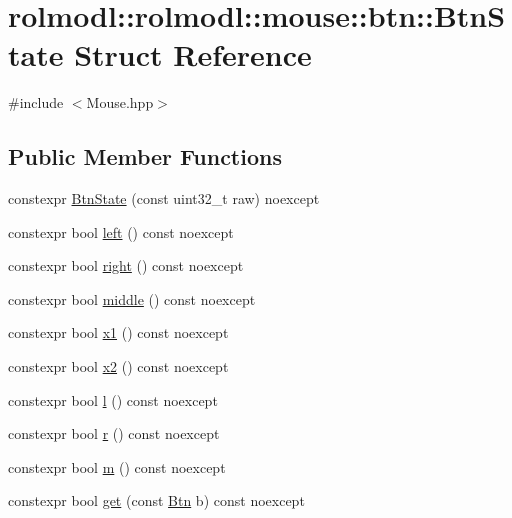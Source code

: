 \hypertarget{structrolmodl_1_1rolmodl_1_1mouse_1_1btn_1_1_btn_state}{}\section{rolmodl\+::rolmodl\+::mouse\+::btn\+::Btn\+State Struct Reference}
\label{structrolmodl_1_1rolmodl_1_1mouse_1_1btn_1_1_btn_state}


{\ttfamily \#include $<$Mouse.\+hpp$>$}

\subsection*{Public Member Functions}
\begin{DoxyCompactItemize}
\item 
constexpr \mbox{\hyperlink{structrolmodl_1_1rolmodl_1_1mouse_1_1btn_1_1_btn_state_a4d3185f0d2e974cb44051067c995b3b2}{Btn\+State}} (const uint32\+\_\+t raw) noexcept
\item 
constexpr bool \mbox{\hyperlink{structrolmodl_1_1rolmodl_1_1mouse_1_1btn_1_1_btn_state_a2b50d4b38757939b2fbd71ba99dbcecd}{left}} () const noexcept
\item 
constexpr bool \mbox{\hyperlink{structrolmodl_1_1rolmodl_1_1mouse_1_1btn_1_1_btn_state_a1d7ded964d561d1560a88d66f44c83a8}{right}} () const noexcept
\item 
constexpr bool \mbox{\hyperlink{structrolmodl_1_1rolmodl_1_1mouse_1_1btn_1_1_btn_state_a408eb39455a05ee298ad026e617c25ed}{middle}} () const noexcept
\item 
constexpr bool \mbox{\hyperlink{structrolmodl_1_1rolmodl_1_1mouse_1_1btn_1_1_btn_state_a9db57d030d7ec6864e689d58c0e63461}{x1}} () const noexcept
\item 
constexpr bool \mbox{\hyperlink{structrolmodl_1_1rolmodl_1_1mouse_1_1btn_1_1_btn_state_aaa1e0ee5f1da49d2f6d83f983e43e832}{x2}} () const noexcept
\item 
constexpr bool \mbox{\hyperlink{structrolmodl_1_1rolmodl_1_1mouse_1_1btn_1_1_btn_state_ae51d08a933a24f90a6f8487b49ecc9eb}{l}} () const noexcept
\item 
constexpr bool \mbox{\hyperlink{structrolmodl_1_1rolmodl_1_1mouse_1_1btn_1_1_btn_state_a54b06f68dfa6b7a7302f439bc3da97a8}{r}} () const noexcept
\item 
constexpr bool \mbox{\hyperlink{structrolmodl_1_1rolmodl_1_1mouse_1_1btn_1_1_btn_state_a14510ff05e68099d3f8f7742da7d682f}{m}} () const noexcept
\item 
constexpr bool \mbox{\hyperlink{structrolmodl_1_1rolmodl_1_1mouse_1_1btn_1_1_btn_state_a5beec883e4525ad7154274d175241571}{get}} (const \mbox{\hyperlink{namespacerolmodl_1_1rolmodl_1_1mouse_a5ed523191c7ec81f6e69f02b9a616ebf}{Btn}} b) const noexcept
\end{DoxyCompactItemize}


